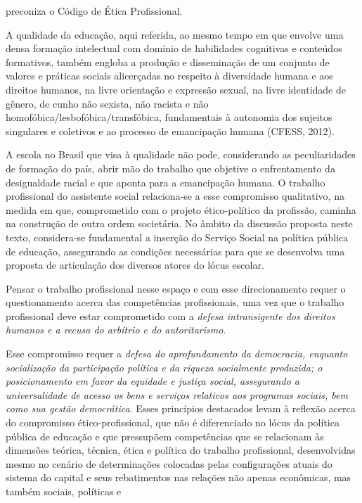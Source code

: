  preconiza o Código de Ética Profissional.\par A qualidade da educação, aqui referida, ao mesmo tempo em que envolve uma densa
 formação intelectual com domínio de habilidades cognitivas e conteúdos formativos,
 também engloba a produção e disseminação de um conjunto de valores e práticas
 sociais alicerçadas no respeito à diversidade humana e aos direitos humanos, na
 livre orientação e expressão sexual, na livre identidade de gênero, de cunho não
 sexista, não racista e não homofóbica/lesbofóbica/transfóbica, fundamentais à
 autonomia dos sujeitos singulares e coletivos e ao processo de emancipação humana
 (CFESS, 2012).\par A escola no Brasil que visa à qualidade não pode, considerando as peculiaridades de
 formação do país, abrir mão do trabalho que objetive o enfrentamento da desigualdade
 racial e que aponta para a emancipação humana. O trabalho profissional do assistente
 social relaciona-se a esse compromisso qualitativo, na medida em que, comprometido
 com o projeto ético-político da profissão, caminha na construção de outra ordem
 societária. No âmbito da discussão proposta neste texto, considera-se fundamental a
 inserção do Serviço Social na política pública de educação, assegurando as condições
 necessárias para que se desenvolva uma proposta de articulação dos diversos atores do
 lócus escolar.\par Pensar o trabalho profissional nesse espaço e com esse direcionamento requer o
 questionamento acerca das competências profissionais, uma vez que o trabalho
 profissional deve estar comprometido com a \textit{defesa intransigente dos direitos
 humanos e a recusa do arbítrio e do autoritarismo}.\par Esse compromisso requer a \textit{defesa do aprofundamento da democracia, enquanto
 socialização da participação política e da riqueza socialmente produzida; o
 posicionamento em favor da equidade e justiça social, assegurando a universalidade
 de acesso os bens e serviços relativos aos programas sociais, bem como sua gestão
 democrática}. Esses princípios destacados levam à reflexão acerca do
 compromisso ético-profissional, que não é diferenciado no lócus da política pública
 de educação e que pressupõem competências que se relacionam às dimensões teórica,
 técnica, ética e política do trabalho profissional, desenvolvidas mesmo no cenário de
 determinações colocadas pelas configurações atuais do sistema do capital e seus
 rebatimentos nas relações não apenas econômicas, mas também sociais, políticas e
